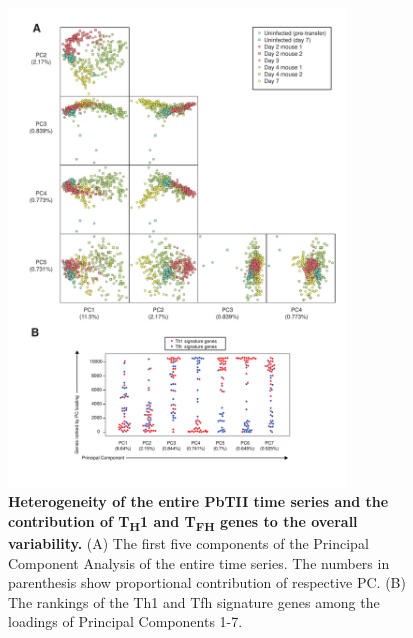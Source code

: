 \begin{figure}
    \centering
    \includegraphics[width=0.8\textwidth]{"Fig S7 rev3"}
    \caption[Heterogeneity of the entire PbTII time series and the contribution of T\textsubscript{H}\textnormal{1} and T\textsubscript{FH} genes to the overall variability]{\textbf{Heterogeneity of the entire PbTII time series and the contribution of T\textsubscript{H}\textnormal{1} and T\textsubscript{FH} genes to the overall variability.} (A) The first five components of the Principal Component Analysis of the entire time series. The numbers in parenthesis show proportional contribution of respective PC. (B) The rankings of the Th1 and Tfh signature genes among the loadings of Principal Components 1-7.}
    \label{fig:ms7}
\end{figure}


